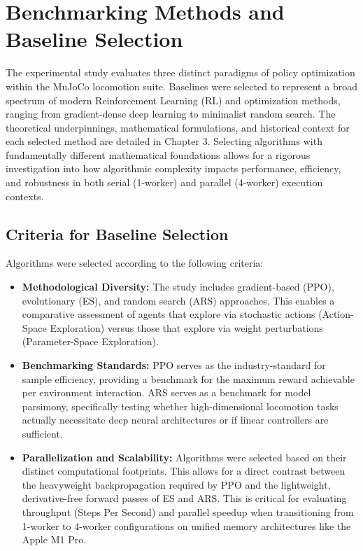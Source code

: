 \section{Benchmarking Methods and Baseline Selection}

The experimental study evaluates three distinct paradigms of policy optimization within the MuJoCo locomotion suite. Baselines were selected to represent a broad spectrum of modern Reinforcement Learning (RL) and optimization methods, ranging from gradient-dense deep learning to minimalist random search. The theoretical underpinnings, mathematical formulations, and historical context for each selected method are detailed in Chapter 3. Selecting algorithms with fundamentally different mathematical foundations allows for a rigorous investigation into how algorithmic complexity impacts performance, efficiency, and robustness in both serial (1-worker) and parallel (4-worker) execution contexts.

\subsection{Criteria for Baseline Selection}

Algorithms were selected according to the following criteria:

\begin{itemize}
    \item \textbf{Methodological Diversity:} The study includes gradient-based (PPO), evolutionary (ES), and random search (ARS) approaches. This enables a comparative assessment of agents that explore via stochastic actions (Action-Space Exploration) versus those that explore via weight perturbations (Parameter-Space Exploration).
    
    \item \textbf{Benchmarking Standards:} PPO serves as the industry-standard for sample efficiency, providing a benchmark for the maximum reward achievable per environment interaction. ARS serves as a benchmark for model parsimony, specifically testing whether high-dimensional locomotion tasks actually necessitate deep neural architectures or if linear controllers are sufficient.
    
    \item \textbf{Parallelization and Scalability:} Algorithms were selected based on their distinct computational footprints. This allows for a direct contrast between the heavyweight backpropagation required by PPO and the lightweight, derivative-free forward passes of ES and ARS. This is critical for evaluating throughput (Steps Per Second) and parallel speedup when transitioning from 1-worker to 4-worker configurations on unified memory architectures like the Apple M1 Pro.
\end{itemize}

